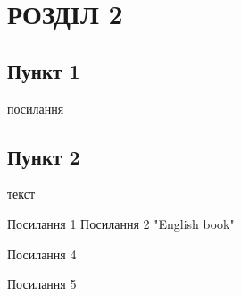 \documentclass[14pt]{extarticle}
\begin{document}
\section{РОЗДІЛ 2}
\subsection{Пункт 1}
посилання \cite{bib1,bib3,bib4,bib5}
\subsection{Пункт 2}
текст

\begin{thebibliography}{9}
Посилання 1
Посилання 2
"English book"

Посилання 4

Посилання 5

\end{thebibliography}
\end{document}
